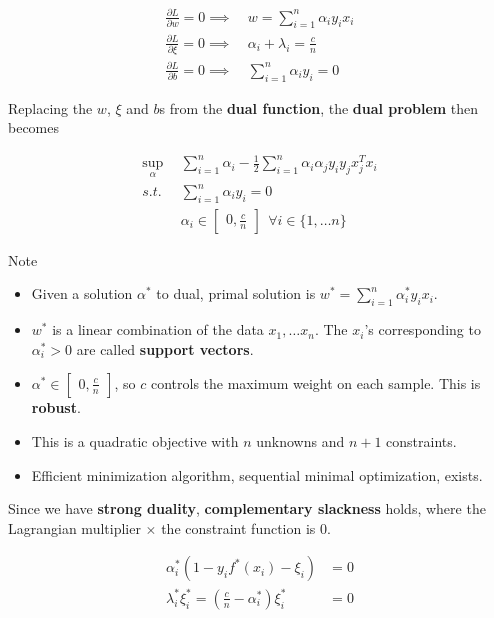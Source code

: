 \documentclass{article}
\DeclareMathOperator*{\msup}{sup}
\begin{document}
\begin{align*}
\frac{\partial L}{\partial w} = 0   \implies & ~w = \sum_{i = 1}^{n}{\alpha_i y_i x_i} \\
\frac{\partial L}{\partial \xi} = 0 \implies & ~\alpha_i + \lambda_i = \frac{c}{n} \\
\frac{\partial L}{\partial b} = 0   \implies & ~\sum_{i = 1}^{n}{\alpha_i y_i = 0}
\end{align*}

Replacing the $w$, $\xi$ and $b$s from the \textbf{dual function}, the \textbf{dual problem} then becomes

\begin{align*}
\msup_{\alpha} ~ ~ & \sum_{i = 1}^{n}{\alpha_i} - \frac{1}{2} \sum_{i = 1}^{n}{\alpha_i \alpha_j y_i y_j x_j^{T} x_i} \\
s.t.               & \sum_{i = 1}^{n}{\alpha_i y_i} = 0 \\
                   & \alpha_i \in \begin{bmatrix}0, \frac{c}{n}\end{bmatrix} ~ ~ \forall i \in \{1, \dots n\}
\end{align*}

Note
\begin{itemize}
  \item Given a solution $\alpha^*$ to dual, primal solution is $w^* = \sum_{i = 1}^{n}{\alpha_i^* y_i x_i}$.
  \item $w^*$ is a linear combination of the data $x_1, \dots x_n$. The $x_i$'s corresponding to $\alpha_i^* > 0$ are called \textbf{support vectors}.
  \item $\alpha^* \in \begin{bmatrix}0, \frac{c}{n}\end{bmatrix}$, so $c$ controls the maximum weight on each sample. This is \textbf{robust}.
  \item This is a quadratic objective with $n$ unknowns and $n + 1$ constraints.
  \item Efficient minimization algorithm, sequential minimal optimization, exists.
\end{itemize}

Since we have \textbf{strong duality}, \textbf{complementary slackness} holds, where the Lagrangian multiplier $\times$ the constraint function is 0.

\begin{align*}
\alpha_i^* (1 - y_i f^*(x_i) - \xi_i)                    &= 0 \\
\lambda_i^* \xi^*_i = (\frac{c}{n} - \alpha_i^*) \xi_i^* &= 0
\end{align*}
\end{document}
